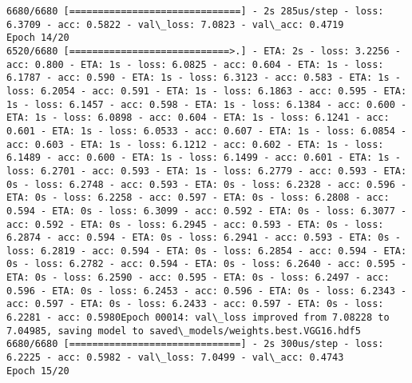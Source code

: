 \documentclass[11pt]{article}
\begin{document}
\begin{Verbatim}[commandchars=\\\{\}]
6680/6680 [==============================] - 2s 285us/step - loss: 6.3709 - acc: 0.5822 - val\_loss: 7.0823 - val\_acc: 0.4719
Epoch 14/20
6520/6680 [============================>.] - ETA: 2s - loss: 3.2256 - acc: 0.800 - ETA: 1s - loss: 6.0825 - acc: 0.604 - ETA: 1s - loss: 6.1787 - acc: 0.590 - ETA: 1s - loss: 6.3123 - acc: 0.583 - ETA: 1s - loss: 6.2054 - acc: 0.591 - ETA: 1s - loss: 6.1863 - acc: 0.595 - ETA: 1s - loss: 6.1457 - acc: 0.598 - ETA: 1s - loss: 6.1384 - acc: 0.600 - ETA: 1s - loss: 6.0898 - acc: 0.604 - ETA: 1s - loss: 6.1241 - acc: 0.601 - ETA: 1s - loss: 6.0533 - acc: 0.607 - ETA: 1s - loss: 6.0854 - acc: 0.603 - ETA: 1s - loss: 6.1212 - acc: 0.602 - ETA: 1s - loss: 6.1489 - acc: 0.600 - ETA: 1s - loss: 6.1499 - acc: 0.601 - ETA: 1s - loss: 6.2701 - acc: 0.593 - ETA: 1s - loss: 6.2779 - acc: 0.593 - ETA: 0s - loss: 6.2748 - acc: 0.593 - ETA: 0s - loss: 6.2328 - acc: 0.596 - ETA: 0s - loss: 6.2258 - acc: 0.597 - ETA: 0s - loss: 6.2808 - acc: 0.594 - ETA: 0s - loss: 6.3099 - acc: 0.592 - ETA: 0s - loss: 6.3077 - acc: 0.592 - ETA: 0s - loss: 6.2945 - acc: 0.593 - ETA: 0s - loss: 6.2874 - acc: 0.594 - ETA: 0s - loss: 6.2941 - acc: 0.593 - ETA: 0s - loss: 6.2819 - acc: 0.594 - ETA: 0s - loss: 6.2854 - acc: 0.594 - ETA: 0s - loss: 6.2782 - acc: 0.594 - ETA: 0s - loss: 6.2640 - acc: 0.595 - ETA: 0s - loss: 6.2590 - acc: 0.595 - ETA: 0s - loss: 6.2497 - acc: 0.596 - ETA: 0s - loss: 6.2453 - acc: 0.596 - ETA: 0s - loss: 6.2343 - acc: 0.597 - ETA: 0s - loss: 6.2433 - acc: 0.597 - ETA: 0s - loss: 6.2281 - acc: 0.5980Epoch 00014: val\_loss improved from 7.08228 to 7.04985, saving model to saved\_models/weights.best.VGG16.hdf5
6680/6680 [==============================] - 2s 300us/step - loss: 6.2225 - acc: 0.5982 - val\_loss: 7.0499 - val\_acc: 0.4743
Epoch 15/20

\end{Verbatim}
\end{document}
